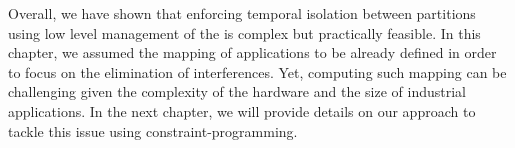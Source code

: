 \documentclass[main.tex]{subfiles}
\begin{document}
Overall, we have shown that enforcing temporal isolation between partitions using low level management of the \mppalong is complex but practically feasible. In this chapter, we assumed the mapping of applications to be already defined in order to focus on the elimination of interferences. Yet, computing such mapping can be challenging given the complexity of the hardware and the size of industrial applications. In the next chapter, we will provide details on our approach to tackle this issue using constraint-programming.

\clearpage
\subbiblio
\end{document}
